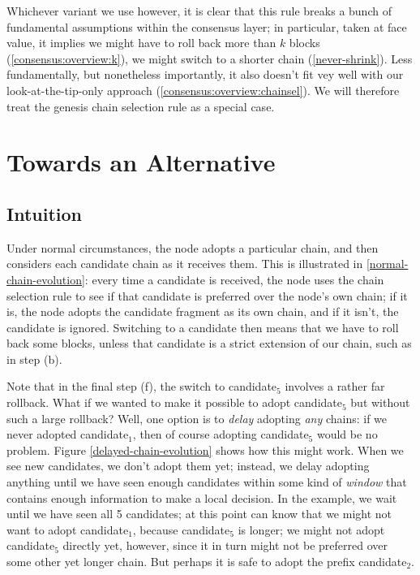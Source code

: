 Whichever variant we use however, it is clear that this rule breaks a bunch of
fundamental assumptions within the consensus layer; in particular, taken at face
value, it implies we might have to roll back more than $k$ blocks
(\cref{consensus:overview:k}), we might switch to a shorter chain
(\cref{never-shrink}). Less fundamentally, but nonetheless importantly, it also
doesn't fit vey well with our look-at-the-tip-only approach
(\cref{consensus:overview:chainsel}). We will therefore treat the genesis
chain selection rule as a special case.


\section{Towards an Alternative}

\subsection{Intuition}

Under normal circumstances, the node adopts a particular chain, and then
considers each candidate chain as it receives them. This is illustrated in
\cref{normal-chain-evolution}: every time a candidate is received, the node uses
the chain selection rule to see if that candidate is preferred over the node's
own chain; if it is, the node adopts the candidate fragment as its own chain,
and if it isn't, the candidate is ignored. Switching to a candidate then means
that we have to roll back some blocks, unless that candidate is a strict
extension of our chain, such as in step (b).

Note that in the final step (f), the switch to candidate$_5$ involves a
rather far rollback. What if we wanted to make it possible to adopt
candidate$_5$ but without such a large rollback? Well, one option is to
\emph{delay} adopting \emph{any} chains: if we never adopted candidate$_1$,
then of course adopting candidate$_5$ would be no problem. Figure
\cref{delayed-chain-evolution} shows how this might work. When we see new
candidates, we don't adopt them yet; instead, we delay adopting anything until
we have seen enough candidates within some kind of \emph{window} that contains
enough information to make a local decision. In the example, we wait until
we have seen all 5 candidates; at this point can know that we might not want
to adopt candidate$_1$, because candidate$_5$ is longer; we might not adopt
candidate$_5$ directly yet, however, since it in turn might not be preferred
over some other yet longer chain. But perhaps it is safe to adopt the
prefix candidate$_2$.



